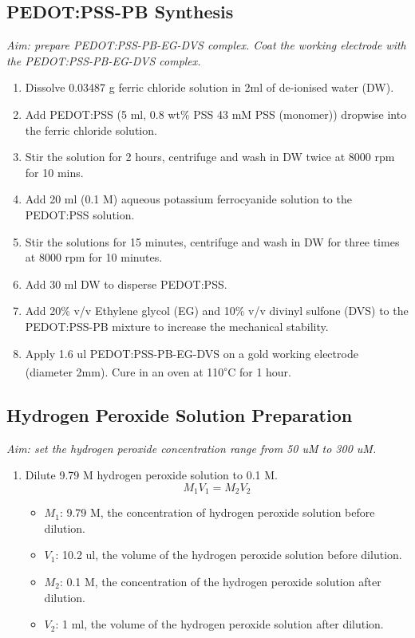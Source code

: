 \begin{appendices}
\subsection{PEDOT:PSS-PB Synthesis}
\textit{Aim: prepare PEDOT:PSS-PB-EG-DVS complex. Coat the working electrode with the  PEDOT:PSS-PB-EG-DVS complex.}
\begin{enumerate}
    \item Dissolve 0.03487 g ferric chloride solution in 2ml of de-ionised water (DW).
    \item 	Add PEDOT:PSS (5 ml, 0.8 wt\% PSS 43 mM PSS (monomer)) dropwise into the ferric chloride solution.
    \item Stir the solution for 2 hours, centrifuge and wash in DW twice at 8000 rpm for 10 mins.
    \item Add 20 ml (0.1 M) aqueous potassium ferrocyanide solution to the PEDOT:PSS solution.
    \item Stir the solutions for 15 minutes, centrifuge and wash in DW for three times at 8000 rpm for 10 minutes.
    \item Add 30 ml DW to disperse PEDOT:PSS.
    \item Add 20\% v/v Ethylene glycol (EG) and 10\% v/v divinyl sulfone (DVS) to the PEDOT:PSS-PB mixture to increase the mechanical stability.
    \item Apply 1.6 ul PEDOT:PSS-PB-EG-DVS on a gold working electrode (diameter 2mm). Cure in an oven at 110\textsuperscript{$\circ$}C for 1 hour.
\end{enumerate}
\subsection{Hydrogen Peroxide Solution Preparation}
\textit{Aim: set the hydrogen peroxide concentration range from 50 uM to 300 uM.}
\begin{enumerate}
    \item Dilute 9.79 M hydrogen peroxide 
    solution to 0.1 M.
    \[M_{1}V_{1} = M_{2}V_{2}\]
    \begin{itemize}
        \item $M_1$: 9.79 M, the concentration of hydrogen peroxide solution before dilution.
        \item $V_1$: 10.2 ul, the volume of the hydrogen peroxide solution before dilution.
        \item $M_2$: 0.1 M, the concentration of the hydrogen peroxide solution after dilution.
        \item $V_2$: 1 ml, the volume of the hydrogen peroxide solution after dilution.
    \end{itemize}
    

\end{enumerate}
\end{appendices}
